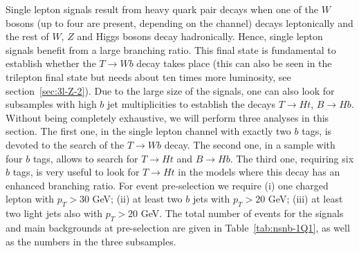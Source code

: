 \documentclass[12pt,a4paper]{article}
\begin{document}
Single lepton signals result from heavy quark pair decays when one of the $W$ bosons (up to four are present, depending on the channel) decays leptonically and the rest of $W$, $Z$ and Higgs bosons decay hadronically. Hence, single lepton signals benefit from a large branching ratio. This final state is fundamental to establish whether the $T \to Wb$ decay takes place (this can also be seen in the trilepton final state but needs about ten times more luminosity, see section~\ref{sec:3l-Z-2}). Due to the large size of the signals, one can also look for subsamples with high $b$ jet multiplicities to establish the decays $T \to Ht$, $B \to Hb$. Without being completely exhaustive, we will perform three analyses in this section. The first one, in the single lepton channel with exactly two $b$ tags, is devoted to the search of the $T \to Wb$ decay. The second one, in a sample with four $b$ tags, allows to search for $T \to Ht$ and $B \to Hb$. The third one, requiring six $b$ tags, is very useful to look for $T \to Ht$ in the models where this decay has an enhanced branching ratio. For event pre-selection we require (i) one charged lepton with $p_T > 30$ GeV; (ii) at least two $b$ jets with $p_T > 20$ GeV; (iii) at least two light jets also with $p_T > 20$ GeV. The total number of events for the signals and main backgrounds at pre-selection  are given in Table~\ref{tab:nsnb-1Q1}, as well as the numbers in the three subsamples.
\end{document}
